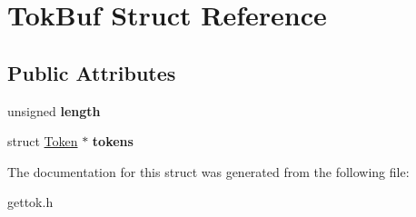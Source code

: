 \hypertarget{structTokBuf}{\section{Tok\-Buf Struct Reference}
\label{structTokBuf}
}
\subsection*{Public Attributes}
\begin{DoxyCompactItemize}
\item 
\hypertarget{structTokBuf_abaf9fa3fa0f84c0d8ca9de96e6232f76}{unsigned {\bfseries length}}\label{structTokBuf_abaf9fa3fa0f84c0d8ca9de96e6232f76}

\item 
\hypertarget{structTokBuf_a28af08166580d27022976745411e15f5}{struct \hyperlink{structToken}{Token} $\ast$ {\bfseries tokens}}\label{structTokBuf_a28af08166580d27022976745411e15f5}

\end{DoxyCompactItemize}


The documentation for this struct was generated from the following file\-:\begin{DoxyCompactItemize}
\item 
gettok.\-h\end{DoxyCompactItemize}
